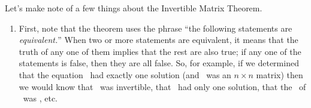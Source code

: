 \smallskip


Let's make note of a few things about the Invertible Matrix Theorem. 
\begin{enumerate}
\item		First, note that the theorem uses the phrase ``the following statements are {\em equivalent.}'' When two or more statements are equivalent, it means that the truth of any one of them implies that the rest are also true; if any one of the statements is false, then they are all false. So, for example, if we determined that the equation \ttaxo\ had exactly one solution (and \tta\ was an $n\times n$ matrix) then we would know that \tta\ was invertible, that \ttaxb\ had only one solution, that the \rref\ of \tta\ was \tti, etc.


\end{enumerate}
